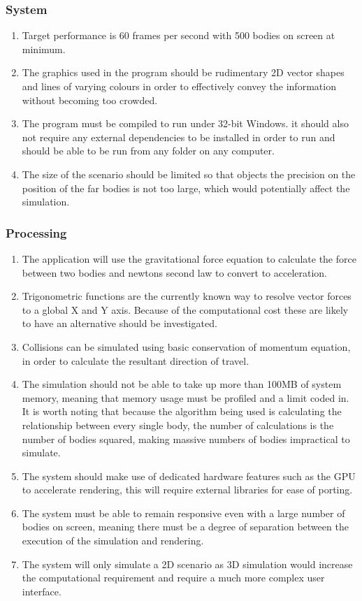 \subsubsection{System}
\begin{enumerate}
\item Target performance is 60 frames per second with 500 bodies on screen at minimum.
\item The graphics used in the program should be rudimentary 2D vector shapes and lines of varying colours in order to effectively convey the information without becoming too crowded.
\item The program must be compiled to run under 32-bit Windows. it should also not require any external dependencies to be installed in order to run and should be able to be run from any folder on any computer.
\item The size of the scenario should be limited so that objects the precision on the position of the far bodies is not too large, which would potentially affect the simulation.
\end{enumerate}

\subsubsection{Processing}
\begin{enumerate}
\item The application will use the gravitational force equation to calculate the force between two bodies and newtons second law to convert to acceleration.
\item Trigonometric functions are the currently known way to resolve vector forces to a global X and Y axis. Because of the computational cost these are likely to have an alternative should be investigated.
\item Collisions can be simulated using basic conservation of momentum equation, in order to calculate the resultant direction of travel.
\item The simulation should not be able to take up more than 100MB of system memory, meaning that memory usage must be profiled and a limit coded in. It is worth noting that because the algorithm being used is calculating the relationship between every single body, the number of calculations is the number of bodies squared, making massive numbers of bodies impractical to simulate.
\item The system should make use of dedicated hardware features such as the GPU to accelerate rendering, this will require external libraries for ease of porting.
\item The system must be able to remain responsive even with a large number of bodies on screen, meaning there must be a degree of separation between the execution of the simulation and rendering.
\item The system will only simulate a 2D scenario as 3D simulation would increase the computational requirement and require a much more complex user interface.
\end{enumerate}


